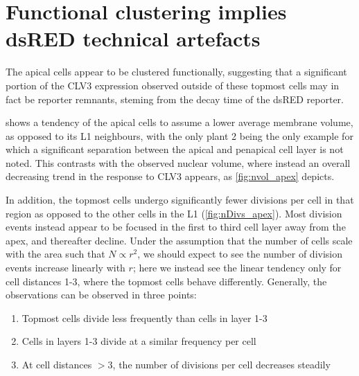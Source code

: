 

 \section{Functional clustering implies dsRED technical artefacts}
 The apical cells appear to be clustered functionally, suggesting that a
 significant portion of the CLV3 expression observed outside of these topmost
 cells may in fact be reporter remnants, steming from the decay time of the
 dsRED reporter. 
 
  shows a tendency of the apical cells to
 assume a lower average membrane volume, as opposed to its L1 neighbours, with
 the only plant 2 being the only example for which a significant separation
 between the apical and penapical cell layer is not noted. This
 contrasts with the observed nuclear volume, where instead an overall decreasing
 trend in the response to CLV3 appears, as \cref{fig:nvol_apex} depicts.
 
 In addition, the topmost cells undergo significantly fewer divisions per cell in
 that region as opposed to the other cells in the L1 (\cref{fig:nDivs_apex}).
 Most division events instead appear to be focused in the first to third cell
 layer away from the apex, and thereafter decline. Under the assumption that the
 number of cells scale with the area such that $N \propto r^2$, we should expect
 to see the number of division events increase linearly with $r$; here we
 instead see the linear tendency only for cell distances 1-3, where the topmost cells
 behave differently. Generally, the observations can be observed in three
 points:
 \begin{enumerate}
   \item Topmost cells divide less frequently than cells in layer 1-3
   \item Cells in layers 1-3 divide at a similar frequency per cell
   \item At cell distances $>3$, the number of divisions per cell decreases
     steadily
 \end{enumerate}

